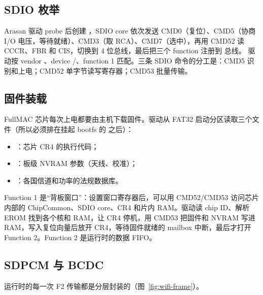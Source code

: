 \subsection{SDIO 枚举}

Arasan 驱动 probe 后创建 ，SDIO core 依次发送 CMD0（复位）、CMD5（协商 I/O 电压，等待就绪）、CMD3（取 RCA）、CMD7（选中），再用 CMD52 读 CCCR、FBR 和 CIS，切换到 4 位总线，最后把三个 function 注册到  总线。 驱动按 vendor 、device /、function 1 匹配。三条 SDIO 命令的分工是：CMD5 识别和上电；CMD52 单字节读写寄存器；CMD53 批量传输。

\subsection{固件装载}

FullMAC 芯片每次上电都要由主机下载固件。驱动从 FAT32 启动分区读取三个文件（所以必须排在挂起 bootfs 的  之后）：

\begin{itemize}
  \item {}：芯片 CR4 的执行代码；
  \item {}：板级 NVRAM 参数（天线、校准）；
  \item {}：各国信道和功率的法规数据库。
\end{itemize}

Function 1 是“背板窗口”：设置窗口寄存器后，可以用 CMD52/CMD53 访问芯片内部的 ChipCommon、SDIO core、CR4 和片内 RAM。驱动读 chip ID、解析 EROM 找到各个核和 RAM，让 CR4 停机，用 CMD53 把固件和 NVRAM 写进 RAM，写入复位向量后放开 CR4，等待固件就绪的 mailbox 中断，最后才打开 Function 2。Function 2 是运行时的数据 FIFO。

\subsection{SDPCM 与 BCDC}

运行时的每一次 F2 传输都是分层封装的（图~\ref{fig:wifi-frame}）。

